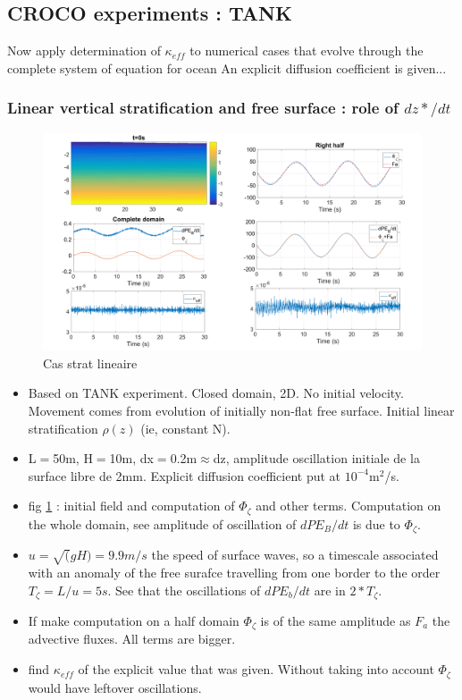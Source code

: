 \subsection{CROCO experiments : TANK}

Now apply determination of $\kappa_{eff}$ to numerical cases that evolve through the complete system of equation for ocean
An explicit diffusion coefficient is given...

\subsubsection{Linear vertical stratification and free surface : role of $dz*/dt$}

\begin{figure}[h!]
\centering
\includegraphics[width=1\textwidth]{./CHAP_BPE/Fig_TANK_linS.png}
\caption{Cas strat lineaire}
\label{figClin}
\end{figure}

\begin{itemize}
\item Based on TANK experiment. Closed domain, 2D. No initial velocity. Movement comes from evolution of initially non-flat free surface. Initial linear stratification $\rho(z)$ (ie, constant N).
\item L$=$50m, H$=$10m, dx$=$0.2m$\approx$dz, amplitude oscillation initiale de la surface libre de 2mm. Explicit diffusion coefficient put at $10^{-4}$m$^2$/s.
\item fig \ref{figClin} : initial field and computation of $\Phi_{\zeta}$ and other terms. Computation on the whole domain, see amplitude of oscillation of $dPE_B/dt$ is due to $\Phi_{\zeta}$.
\item $u=\sqrt(gH)=9.9 m/s$ the speed of surface waves, so a timescale associated with an anomaly of the free surafce travelling from one border to the order $T_{\zeta}=L/u=5s$. See that the oscillations of $dPE_b/dt$ are in $2*T_{\zeta}$.
\item If make computation on a half domain $\Phi_{\zeta}$ is of the same amplitude as $F_a$ the advective fluxes. All terms are bigger.
\item find $\kappa_{eff}$ of the explicit value that was given. Without taking into account $\Phi_{\zeta}$ would have leftover oscillations.
\end{itemize}

